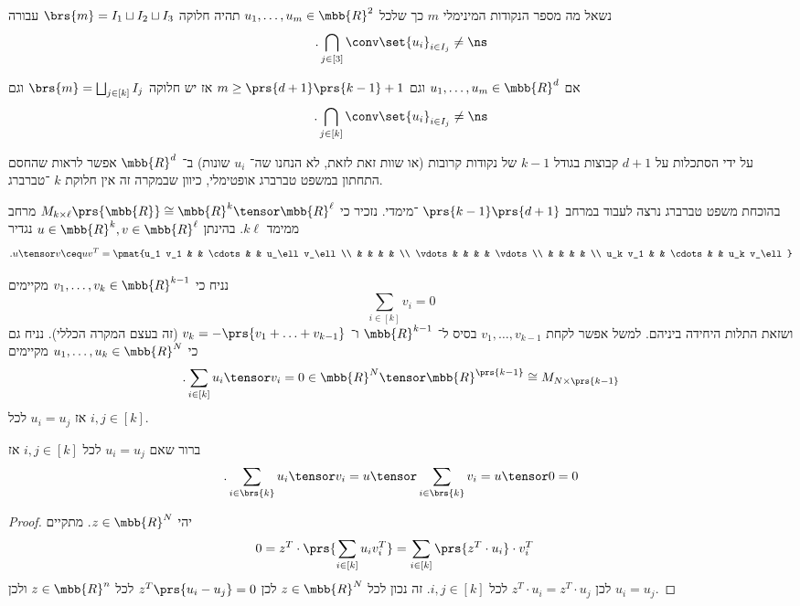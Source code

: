 \documentclass[a4paper,10pt,twoside,openany]{book}
\begin{document}
נשאל מה מספר הנקודות המינימלי
$m$
כך שלכל
$u_1, \ldots, u_m \in \mbb{R}^2$
תהיה חלוקה
$\brs{m} = I_1 \sqcup I_2 \sqcup I_3$
עבורה
\[\text{.} \bigcap_{j \in [3]} \conv\set{u_i}_{i \in I_j} \neq \ns\]

\begin{theorem}[טברברג] \label{theorem:tverberg}
אם
$u_1, \ldots, u_m \in \mbb{R}^d$
וגם
$m \geq \prs{d+1}\prs{k-1} + 1$
אז יש חלוקה
$\brs{m} = \bigsqcup_{j \in [k]} I_j$
וגם
\[\text{.} \bigcap_{j \in [k]} \conv\set{u_i}_{i \in I_j} \neq \ns\]
\end{theorem}

\begin{remark}
על ידי הסתכלות על
$d+1$
קבוצות בגודל
$k-1$
 של נקודות קרובות (או שוות זאת לזאת, לא הנחנו שה־%
$u_i$
שונות)
  ב־%
$\mbb{R}^d$
אפשר לראות שהחסם התחתון במשפט טברברג אופטימלי, כיוון שבמקרה זה אין חלוקת
$k$%
־טברברג.
\end{remark}


בהוכחת משפט טברברג נרצה לעבוד במרחב
$\prs{k-1}\prs{d+1}$%
־מימדי.
נזכיר כי
$M_{k \times \ell}\prs{\mbb{R}} \cong \mbb{R}^k \tensor \mbb{R}^\ell$
מרחב ממימד
$k\ell$.
בהינתן
$u \in \mbb{R}^k, v \in \mbb{R}^\ell$
נגדיר
\[\text{.} u \tensor v \ceq u v^T = \pmat{u_1 v_1 & & \cdots & & u_\ell v_\ell \\ & & & & \\ \vdots & & & & \vdots \\ & & & & \\ u_k v_1 & & \cdots & & u_k v_\ell}\]

\begin{proposition}
נניח כי
$v_1, \ldots, v_k \in \mbb{R}^{k-1}$
מקיימים
\[\sum_{i \in [k]} v_i = 0\]
ושזאת התלות היחידה ביניהם.
למשל אפשר לקחת
$v_1, \ldots, v_{k-1}$
בסיס ל־%
$\mbb{R}^{k-1}$
ו־%
$v_k = -\prs{v_1 + \ldots + v_{k-1}}$
(זה בעצם המקרה הכללי).
נניח גם כי
$u_1, \ldots, u_k \in \mbb{R}^{N}$
מקיימים
\[\text{.} \sum_{i \in [k]} u_i \tensor v_i = 0 \in \mbb{R}^N \tensor \mbb{R}^{\prs{k-1}} \cong M_{N \times \prs{k-1}}\]
אז
$u_i = u_j$
לכל
$i,j \in [k]$.
\end{proposition}

\begin{remark}
ברור שאם
$u_i = u_j$
לכל
$i,j \in [k]$
אז
\[\text{.} \sum_{i \in \brs{k}} u_i \tensor v_i = u \tensor \sum_{i \in \brs{k}} v_i = u \tensor 0 = 0\]
\end{remark}

\begin{proof}
יהי
$z \in \mbb{R}^N$.
מתקיים
\begin{align*}
0 &= z^T \cdot \prs{\sum_{i \in [k]} u_i v_i^T} = \sum_{i \in [k]} \prs{z^T \cdot u_i} \cdot v_i^T
\end{align*}
לכן
$z^T \cdot u_i = z^T \cdot u_j$
לכל
$i,j \in [k]$.
זה נכון לכל
$z \in \mbb{R}^N$
לכן
$z^T \prs{u_i - u_j} = 0$
לכל
$z \in \mbb{R}^n$
ולכן
$u_i = u_j$.
\end{proof}
\end{document}
